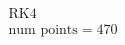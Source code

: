 \documentclass[preview]{standalone}
\begin{document}
\begin{align*}
\text{RK4} \\ \text{num points} = 470
\end{align*}
\end{document}

